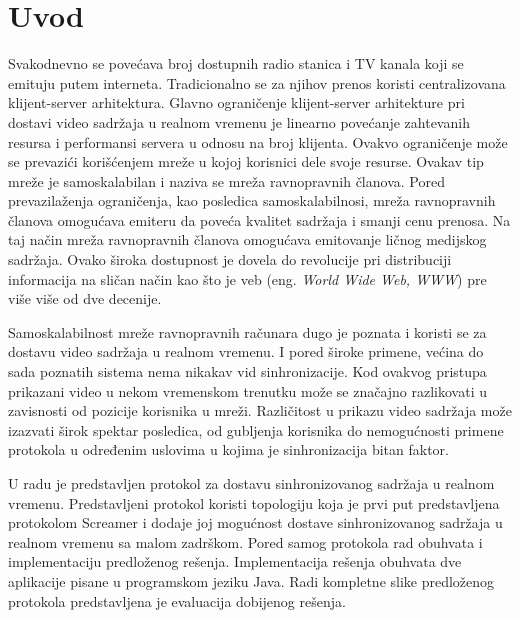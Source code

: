 \documentclass[12pt,oneside]{memoir}
\begin{document}
\frontmatter
\naslovna
\komisija
\apstrakt
\tableofcontents*

\mainmatter

\chapter{Uvod}
Svakodnevno se povećava broj dostupnih radio stanica i TV kanala koji se emituju putem interneta. Tradicionalno se za njihov prenos koristi centralizovana klijent-server arhitektura. Glavno ograničenje klijent-server arhitekture pri dostavi video sadržaja u realnom vremenu je linearno povećanje zahtevanih resursa i performansi servera u odnosu na broj klijenta. Ovakvo ograničenje može se prevazići korišćenjem mreže u kojoj korisnici dele svoje resurse. Ovakav tip mreže je samoskalabilan i naziva se mreža ravnopravnih članova. Pored prevazilaženja ograničenja, kao posledica samoskalabilnosi, mreža ravnopravnih članova omogućava emiteru da poveća kvalitet sadržaja i smanji cenu prenosa. Na taj način mreža ravnopravnih članova omogućava emitovanje ličnog medijskog sadržaja. Ovako široka dostupnost je dovela do revolucije pri distribuciji informacija na sličan način kao što je veb (eng. \textit{World Wide Web, WWW}) pre više više od dve decenije.

Samoskalabilnost mreže ravnopravnih računara dugo je poznata i koristi se za dostavu video sadržaja u realnom vremenu. I pored široke primene, većina do sada poznatih sistema nema nikakav vid sinhronizacije. Kod ovakvog pristupa prikazani video u nekom vremenskom trenutku može se značajno razlikovati u zavisnosti od pozicije korisnika u mreži. Različitost u prikazu video sadržaja može izazvati širok spektar posledica, od gubljenja korisnika do nemogućnosti primene protokola u određenim uslovima u kojima je sinhronizacija bitan faktor.

U radu je predstavljen protokol za dostavu sinhronizovanog sadržaja u realnom vremenu. Predstavljeni protokol koristi topologiju koja je prvi put predstavljena protokolom  Screamer i dodaje joj mogućnost dostave sinhronizovanog sadržaja u realnom vremenu sa malom zadrškom. Pored samog protokola rad obuhvata i implementaciju predloženog rešenja. Implementacija rešenja obuhvata dve aplikacije pisane u programskom jeziku Java. Radi kompletne slike predloženog protokola predstavljena je evaluacija dobijenog rešenja. 
  
\end{document}

